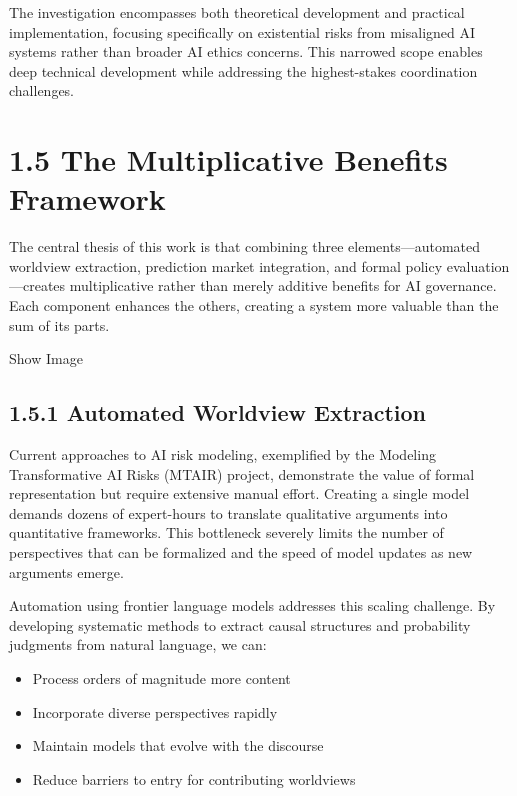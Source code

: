 \documentclass[
  11pt,
  letterpaper,
]{book}
\providecommand{\tightlist}{%
  \setlength{\itemsep}{0pt}\setlength{\parskip}{0pt}}
\begin{document}
The investigation encompasses both theoretical development and practical
implementation, focusing specifically on existential risks from
misaligned AI systems rather than broader AI ethics concerns. This
narrowed scope enables deep technical development while addressing the
highest-stakes coordination challenges.

\section{1.5 The Multiplicative Benefits
Framework}\label{the-multiplicative-benefits-framework}

The central thesis of this work is that combining three
elements---automated worldview extraction, prediction market
integration, and formal policy evaluation---creates multiplicative
rather than merely additive benefits for AI governance. Each component
enhances the others, creating a system more valuable than the sum of its
parts.

Show Image

\subsection{1.5.1 Automated Worldview
Extraction}\label{automated-worldview-extraction}

Current approaches to AI risk modeling, exemplified by the Modeling
Transformative AI Risks (MTAIR) project, demonstrate the value of formal
representation but require extensive manual effort. Creating a single
model demands dozens of expert-hours to translate qualitative arguments
into quantitative frameworks. This bottleneck severely limits the number
of perspectives that can be formalized and the speed of model updates as
new arguments emerge.

Automation using frontier language models addresses this scaling
challenge. By developing systematic methods to extract causal structures
and probability judgments from natural language, we can:

\begin{itemize}
\tightlist
\item
  Process orders of magnitude more content
\item
  Incorporate diverse perspectives rapidly
\item
  Maintain models that evolve with the discourse
\item
  Reduce barriers to entry for contributing worldviews
\end{itemize}
\end{document}
